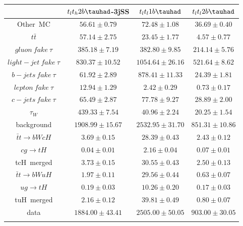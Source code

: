 \centering
\begin{tabular}{cccc} \toprule\toprule
 & $t_{l}t_{h}2b\tauhad$-3jSS & $t_{l}t_{l}1b\tauhad$ & $t_{l}t_{l}2b\tauhad$ \\\midrule
\hspace{9mm} Other~MC & $56.61\pm0.79$ & $72.48\pm1.08$ & $36.69\pm0.40$ \\
\hspace{9mm}$t\bar{t}$ & $57.14\pm2.75$ & $23.45\pm1.77$ & $4.57\pm0.77$\\
\hspace{9mm}$gluon~fake~\tau$ & $385.18\pm7.19$ & $382.80\pm9.85$ & $214.14\pm5.76$\\
\hspace{9mm}$light-jet~fake~\tau$ & $830.37\pm10.52$ & $1054.64\pm26.16$ & $521.64\pm8.62$\\
\hspace{9mm}$b-jets~fake~\tau$ & $61.92\pm2.89$ & $878.41\pm11.33$ & $24.39\pm1.81$\\
\hspace{9mm}$lepton~fake~\tau$ & $12.94\pm1.29$ & $2.42\pm0.29$ & $0.73\pm0.17$\\
\hspace{9mm}$c-jets~fake~\tau$ & $65.49\pm2.87$ & $77.78\pm9.27$ & $28.89\pm2.00$\\
\hspace{9mm}$\tau_{W}$ & $439.33\pm7.54$ & $40.96\pm2.24$ & $20.25\pm1.54$\\
background & $1908.99\pm15.67$ & $2532.95\pm31.70$ & $851.31\pm10.86$\\\midrule
\hspace{9mm}$\bar{t}t\to bWcH$ & $3.69\pm0.15$ & $28.39\pm0.43$ & $2.43\pm0.12$\\
\hspace{9mm}$cg\to tH$ & $0.04\pm0.01$ & $2.16\pm0.04$ & $0.07\pm0.01$\\
tcH~merged & $3.73\pm0.15$ & $30.55\pm0.43$ & $2.50\pm0.13$\\
$\bar{t}t\to bWuH$ & $1.97\pm0.11$ & $29.56\pm0.44$ & $0.63\pm0.07$\\
\hspace{9mm}$ug\to tH$ & $0.19\pm0.03$ & $10.26\pm0.20$ & $0.17\pm0.03$\\
\hspace{9mm}tuH~merged & $2.16\pm0.12$ & $39.81\pm0.49$ & $0.80\pm0.07$\\\midrule
data & $1884.00\pm43.41$ & $2505.00\pm50.05$ & $903.00\pm30.05$\\
\bottomrule\bottomrule\\
\end{tabular}
